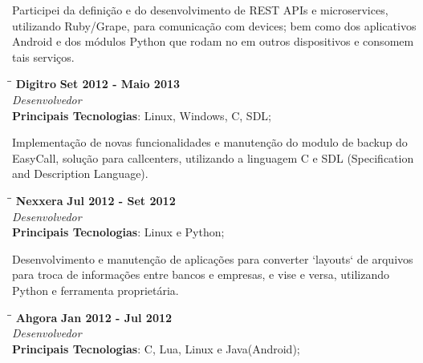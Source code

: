 \documentclass[margin]{res}
\begin{document}
\begin{resume}
Participei da definição e do desenvolvimento de REST APIs e microservices, utilizando Ruby/Grape, para comunicação com devices; bem como dos aplicativos Android e dos módulos Python que rodam no em outros dispositivos e consomem tais serviços.


\vspace{-0.1in}
   \begin{tabbing}
   \hspace{2.3in}\= \hspace{1.7in}\= \kill %
    \textbf{Digitro}    \>\>\textbf{Set 2012 - Maio 2013}\\
    \textit{Desenvolvedor}\\
    \textbf{Principais Tecnologias}: Linux, Windows, C, SDL;
   \end{tabbing}\vspace{-20pt}      %
    \vspace{2mm}
    
    Implementação de novas funcionalidades e manutenção do modulo de backup do EasyCall, solução para callcenters, utilizando a linguagem C e SDL (Specification and Description Language).

   \begin{tabbing}
   \hspace{2.3in}\= \hspace{1.7in}\= \kill %
    \textbf{Nexxera}    \>\>\textbf{Jul 2012 - Set 2012}\\
    \textit{Desenvolvedor}\\
    \textbf{Principais Tecnologias}: Linux e Python;
   \end{tabbing}\vspace{-20pt}      %
    \vspace{2mm}
    Desenvolvimento e manutenção de aplicações para converter `layouts` de arquivos para troca de informações entre bancos e empresas, e vise e versa, utilizando Python e ferramenta proprietária.

   \begin{tabbing}
   \hspace{2.3in}\= \hspace{1.5in}\= \kill %
    \textbf{Ahgora}    \>\>\textbf{Jan 2012 - Jul 2012}\\
    \textit{Desenvolvedor}\\
    \textbf{Principais Tecnologias}: C, Lua, Linux e Java(Android);
   \end{tabbing}\vspace{-20pt}      %
    \vspace{2mm}
    

\end{resume}
\end{document}
